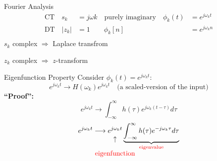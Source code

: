 \begin{frame}{Fourier Analysis}
\begin{align*}
  \text{CT}\quad s_k &= j\omega k\quad \text{purely imaginary} \quad \phi_k(t) &= e^{j\omega_k t}\\
  \text{DT}\quad |z_k| &= 1\quad \text{} \quad \phi_k[n] &= e^{j\omega_k n}\\
\end{align*}
$s_k$ complex $\Rightarrow$  Laplace transfrom\par
$z_k$ complex $\Rightarrow$ $z$-transform

\end{frame}

\begin{frame}{Eigenfunction Property}
    Consider $\phi_k(t) = e^{j\omega_k t}$:
    \begin{equation*}
        e^{j\omega_k t} \longrightarrow H(\omega_k) e^{j\omega_k t} \quad \text{(a scaled-version of the input)}
    \end{equation*}
    \textbf{``Proof'':}\pause
    {
        \begin{equation*}
            e^{j\omega_k t} \longrightarrow \int_{-\infty}^{\infty}h(\tau)e^{j\omega_k (t-\tau)}d\tau
        \end{equation*}
        \pause
        \begin{equation*}
            e^{j\omega_k t} \longrightarrow
            \underset{\mathclap{\tikz \node {$\uparrow$} node [below=3ex, text=red] {eigenfunction};}}{
            e^{j\omega_k t}
            }
            \underbrace{
            \int_{-\infty}^{\infty} h(\tau)e^{-j\omega_k \tau}d\tau
            }_{\textcolor{red}{\text{eigenvalue}}}
        \end{equation*}
    }
\end{frame}


